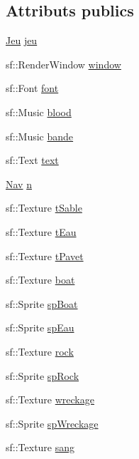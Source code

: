 \subsection*{Attributs publics}
\begin{DoxyCompactItemize}
\item 
\hyperlink{class_jeu}{Jeu} \hyperlink{classsfml_jeu_a972b009479df826eec0770228801d8cc}{jeu}
\item 
sf\+::\+Render\+Window \hyperlink{classsfml_jeu_ada6aaa97c0ed2b0eaa7c22a0368c00e8}{window}
\item 
sf\+::\+Font \hyperlink{classsfml_jeu_aac966b4526ff0f881b0c1042000870a0}{font}
\item 
sf\+::\+Music \hyperlink{classsfml_jeu_ae2dfd174ce328a683bfb739b1bd2b2d0}{blood}
\item 
sf\+::\+Music \hyperlink{classsfml_jeu_a512230a2e7a93572276f5620bccecdb4}{bande}
\item 
sf\+::\+Text \hyperlink{classsfml_jeu_a64c38ef56e08ff1e7843a06838e4ff2a}{text}
\item 
\hyperlink{class_nav}{Nav} \hyperlink{classsfml_jeu_af52340eef27ec0fa2d5f5056497a27af}{n}
\item 
sf\+::\+Texture \hyperlink{classsfml_jeu_a0aa4898423487bb9d28188258b1907a8}{t\+Sable}
\item 
sf\+::\+Texture \hyperlink{classsfml_jeu_a595c5e3d921d50ae53aa7b222c3a5675}{t\+Eau}
\item 
sf\+::\+Texture \hyperlink{classsfml_jeu_a5b320baa4d1cc76a169a6de08f883016}{t\+Pavet}
\item 
sf\+::\+Texture \hyperlink{classsfml_jeu_aff8d44d5e9731ebf14466cf5fe45f5fb}{boat}
\item 
sf\+::\+Sprite \hyperlink{classsfml_jeu_a4f6e88a39bf6dcdd9241786f1a3d2bd1}{sp\+Boat}
\item 
sf\+::\+Sprite \hyperlink{classsfml_jeu_a32d727d72cc7c62f304a5e38c87610a0}{sp\+Eau}
\item 
sf\+::\+Texture \hyperlink{classsfml_jeu_a1dbe690542f7e63725f2c9968aa865ee}{rock}
\item 
sf\+::\+Sprite \hyperlink{classsfml_jeu_a37e36196c79678f0816d42139b7e3059}{sp\+Rock}
\item 
sf\+::\+Texture \hyperlink{classsfml_jeu_a493f61a58fd454fcf6e1871a8a8999b6}{wreckage}
\item 
sf\+::\+Sprite \hyperlink{classsfml_jeu_a2e2876790446e44039c53e7e48cdd9cd}{sp\+Wreckage}
\item 
sf\+::\+Texture \hyperlink{classsfml_jeu_ad49d0c9ff047d4376ca998a9a5ec5584}{sang}

\end{DoxyCompactItemize}
